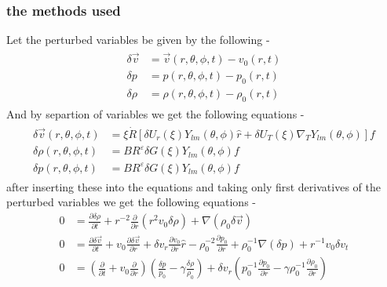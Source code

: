 \documentclass{article}
\begin{document}
\subsubsection{the methods used}
Let the perturbed variables be given by the following -
\begin{align}
    \begin{split}
        \delta\vec{v} &= \vec{v}\left(r,\theta,\phi,t\right) - v_{0}\left(r,t\right) \\
        \delta p &= p\left(r,\theta,\phi,t\right) - p_{0}\left(r,t\right) \\
        \delta\rho &= \rho\left(r,\theta,\phi,t\right) - \rho_{0}\left(r,t\right)        
    \end{split}
\end{align}
And by separtion of variables we get the following equations -
\begin{align}
    \begin{split}
        \delta\vec{v}\left(r,\theta,\phi,t\right) &= \xi\dot{R}\left[\delta U_{r}\left(\xi\right)Y_{lm}\left(\theta,\phi\right)\hat{r}+\delta U_{T}\left(\xi\right)\nabla_{T}Y_{lm}\left(\theta,\phi\right)\right]f\\
        \delta\rho\left(r,\theta,\phi,t\right)&=BR^{\varepsilon}\delta G\left(\xi\right)Y_{lm}\left(\theta,\phi\right)f\\
        \delta p\left(r,\theta,\phi,t\right)&=BR^{\varepsilon}\delta G\left(\xi\right)Y_{lm}\left(\theta,\phi\right)f            
    \end{split}
\end{align}
after inserting these into the equations and taking only first derivatives of the perturbed variables we get the following equations -
\begin{align}
    0 &= \frac{\partial\delta\rho}{\partial t}+r^{-2}\frac{\partial}{\partial r}\left(r^{2}v_{0}\delta\rho\right)+\nabla\left(\rho_{0}\delta\vec{v}\right)\\
    0 &= \frac{\partial\delta\vec{v}}{\partial t}+v_{0}\frac{\partial\delta\vec{v}}{\partial r}+\delta v_{r}\frac{\partial v_{0}}{\partial r}\hat{r}-\rho_{0}^{-2}\frac{\partial p_{0}}{\partial r}+\rho_{0}^{-1}\nabla\left(\delta p\right)+r^{-1}v_{0}\delta v_{t}\\
    0 &= \left(\frac{\partial}{\partial t}+v_{0}\frac{\partial}{\partial r}\right)\left(\frac{\delta p}{p_{0}}-\gamma\frac{\delta\rho}{\rho_{0}}\right)+\delta v_{r}\left(p_{0}^{-1}\frac{\partial p_{0}}{\partial r}-\gamma\rho_{0}^{-1}\frac{\partial\rho_{0}}{\partial r}\right)
\end{align}
\end{document}
